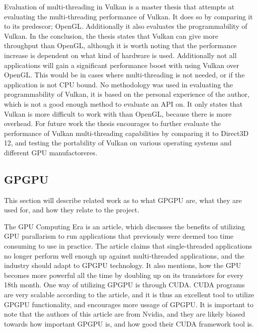 Evaluation of multi-threading in Vulkan \cite{blackert_2016_evaluation} is a master thesis that attempts at evaluating the multi-threading performance of Vulkan. It does so by comparing it to its predescor; OpenGL. 
Additionally it also evaluates the programmability of Vulkan. 
In the conclusion, the thesis states that Vulkan can give more throughput than OpenGL, although it is worth noting that the performance increase is dependent on what kind of hardware is used. Additionally not all applications will gain a significant performance boost with using Vulkan over OpenGL. 
This would be in cases where multi-threading is not needed, or if the application is not CPU bound. No methodology was used in evaluating the programmability of Vulkan, it is based on the personal experience of the author, which is not a good enough method to evaluate an \gls{API} on. 
It only states that Vulkan is more difficult to work with than OpenGL, because there is more overhead. 
For future work the thesis encourages to further evaluate the performance of Vulkan multi-threading  capabilities by comparing it to Direct3D 12, and testing the portability of Vulkan on various operating systems and different \gls{GPU} manufactoreres.

\subsection{GP\gls{GPU}}
This section will describe related work as to what GP\gls{GPU} are, what they are used for, and how they relate to the project.

The GPU Computing Era \cite{gpu_computing_era} is an article, which discusses the benefits of utilizing \gls{GPU} parallarism to run applications that previously were deemed too time consuming to use in practice. 
The article claims that single-threaded applications no longer perform well enough up against multi-threaded applications, and the industry should adapt to GP\gls{GPU} technology. 
It also mentions, how the \gls{GPU} becomes more powerful all the time by doubling up on its transistors for every 18th month. 
One way of utilizing GP\gls{GPU} is through CUDA. 
CUDA programs are very scalable according to the article, and it is thus an excellent tool to utilize GP\gls{GPU} functionality, and encourages more ussage of GP\gls{GPU}. 
It is important to note that the authors of this article are from Nvidia, and they are likely biased towards how important GP\gls{GPU} is, and how good their CUDA framework tool is. 

